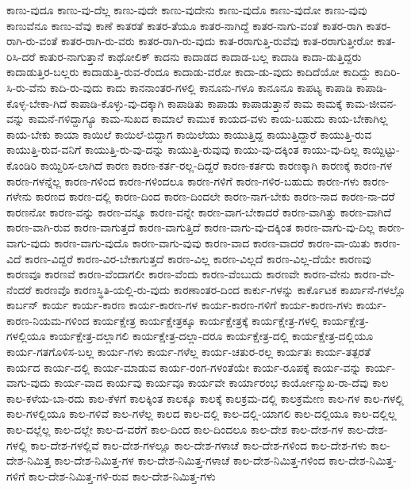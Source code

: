 {ಕಾಣು-ವುದೂ
ಕಾಣು-ವು-ದೆಲ್ಲ
ಕಾಣು-ವುದೇ
ಕಾಣು-ವುದೇನು
ಕಾಣು-ವುದೊ
ಕಾಣು-ವುದೋ
ಕಾಣು-ವುವು
ಕಾಣುವೆನೂ
ಕಾಣು-ವೆವು
ಕಾಣೆ
ಕಾತರತೆ
ಕಾತರ-ತೆಯೂ
ಕಾತರ-ನಾಗಿದ್ದೆ
ಕಾತರ-ನಾಗು-ವಂತೆ
ಕಾತರ-ರಾಗಿ
ಕಾತರ-ರಾಗಿ-ರು-ವಂತೆ
ಕಾತರ-ರಾಗಿ-ರು-ವರು
ಕಾತರ-ರಾಗಿ-ರು-ವುದು
ಕಾತ-ರರಾಗುತ್ತಿ-ರುವೆವು
ಕಾತ-ರರಾಗುತ್ತೀರೋ
ಕಾತ-ರಿಸಿ-ದರೆ
ಕಾತುರ-ನಾಗುತ್ತಾನೆ
ಕಾಥೋಲಿಕ್
ಕಾದನು
ಕಾದಾಡದ
ಕಾದಾಡ-ಬಲ್ಲ
ಕಾದಾಡಿ
ಕಾದಾ-ಡುತ್ತಿದ್ದರು
ಕಾದಾಡುತ್ತಿರ-ಬಲ್ಲರು
ಕಾದಾಡುತ್ತಿ-ರುವ-ರೆಂದೂ
ಕಾದಾಡು-ವರೋ
ಕಾದಾ-ಡು-ವುದು
ಕಾದಿದೆಯೋ
ಕಾದಿದ್ದು
ಕಾದಿರಿ-ಸಿ-ರು-ವೆನು
ಕಾದಿ-ರು-ವುದು
ಕಾದು
ಕಾನನಾಂತರ-ಗಳಲ್ಲಿ
ಕಾನೂನು-ಗಳೂ
ಕಾನೂನೂ
ಕಾಪಟ್ಯ
ಕಾಪಾಡಿ
ಕಾಪಾಡಿ-ಕೊಳ್ಳ-ಬೇಕಾ-ಗಿದೆ
ಕಾಪಾಡಿ-ಕೊಳ್ಳು-ವು-ದಕ್ಕಾಗಿ
ಕಾಪಾಡಿತು
ಕಾಪಾಡು
ಕಾಪಾಡುತ್ತಾನೆ
ಕಾಮ
ಕಾಮಕ್ಕೆ
ಕಾಮ-ಜೀವನ-ವನ್ನು
ಕಾಮನೆ-ಗಳಿದ್ದಾಗ್ಯೂ
ಕಾಮ-ಸುಖದ
ಕಾಮಾಲೆ
ಕಾಮುಕ
ಕಾಯದ-ವಳು
ಕಾಯ-ಬಹುದು
ಕಾಯ-ಬೇಕಾಗಿಲ್ಲ
ಕಾಯ-ಬೇಕು
ಕಾಯಾ
ಕಾಯಿಲೆ
ಕಾಯಿಲೆ-ಬಿದ್ದಾಗ
ಕಾಯಿಲೆಯು
ಕಾಯುತ್ತಿದ್ದ
ಕಾಯುತ್ತಿದ್ದಾರೆ
ಕಾಯುತ್ತಿ-ರುವ
ಕಾಯುತ್ತಿ-ರುವ-ವನಿಗೆ
ಕಾಯುತ್ತಿ-ರು-ವು-ದನ್ನು
ಕಾಯುತ್ತಿ-ರುವುವು
ಕಾಯು-ವು-ದಕ್ಕಿಂತ
ಕಾಯು-ವು-ದಿಲ್ಲ
ಕಾಯ್ದಿಟ್ಟು-ಕೊಂಡಿರಿ
ಕಾಯ್ದಿರಿಸ-ಲಾಗಿದೆ
ಕಾರಣ
ಕಾರಣ-ಕರ್ತ-ರಲ್ಲ-ದಿದ್ದರೆ
ಕಾರಣ-ಕರ್ತರು
ಕಾರಣಕ್ಕಾಗಿ
ಕಾರಣಕ್ಕೆ
ಕಾರಣ-ಗಳ
ಕಾರಣ-ಗಳನ್ನೆಲ್ಲ
ಕಾರಣ-ಗಳಿಂದ
ಕಾರಣ-ಗಳಿಂದಲೂ
ಕಾರಣ-ಗಳಿಗೆ
ಕಾರಣ-ಗಳಿರ-ಬಹುದು
ಕಾರಣ-ಗಳು
ಕಾರಣ-ಗಳೇನು
ಕಾರಣದ
ಕಾರಣ-ದಲ್ಲಿ
ಕಾರಣ-ದಿಂದ
ಕಾರಣ-ದಿಂದಲೇ
ಕಾರಣ-ನಾಗ-ಬೇಕು
ಕಾರಣ-ನಾದ
ಕಾರಣ-ನಾ-ದರೆ
ಕಾರಣನೋ
ಕಾರಣ-ವನ್ನು
ಕಾರಣ-ವನ್ನೂ
ಕಾರಣ-ವನ್ನೇ
ಕಾರಣ-ವಾಗ-ಬೇಕಾದರೆ
ಕಾರಣ-ವಾಗಿತ್ತು
ಕಾರಣ-ವಾಗಿದೆ
ಕಾರಣ-ವಾಗಿ-ರುವ
ಕಾರಣ-ವಾಗುತ್ತದೆ
ಕಾರಣ-ವಾಗುತ್ತಿದೆ
ಕಾರಣ-ವಾಗು-ವು-ದಕ್ಕಿಂತ
ಕಾರಣ-ವಾಗು-ವು-ದಿಲ್ಲ
ಕಾರಣ-ವಾಗು-ವುದು
ಕಾರಣ-ವಾಗು-ವುದೊ
ಕಾರಣ-ವಾಗು-ವುವು
ಕಾರಣ-ವಾದ
ಕಾರಣ-ವಾದರೆ
ಕಾರಣ-ವಾ-ಯಿತು
ಕಾರಣ-ವಿದೆ
ಕಾರಣ-ವಿದ್ದರೆ
ಕಾರಣ-ವಿರ-ಬೇಕಾಗುತ್ತದೆ
ಕಾರಣ-ವಿಲ್ಲ
ಕಾರಣ-ವಿಲ್ಲದೆ
ಕಾರಣ-ವಿಲ್ಲ-ದೆಯೇ
ಕಾರಣವು
ಕಾರಣವೂ
ಕಾರಣವೆ
ಕಾರಣ-ವೆಂದಾಗಲೀ
ಕಾರಣ-ವೆಂದು
ಕಾರಣ-ವೆಂಬುದು
ಕಾರಣವೇ
ಕಾರಣ-ವೇನು
ಕಾರಣ-ವೇ-ನೆಂದರೆ
ಕಾರಣವೊ
ಕಾರಣಸ್ಥಿತಿ-ಯಲ್ಲಿ-ರು-ವುದು
ಕಾರಣಾಂತರ-ದಿಂದ
ಕಾರ್ಕು-ಗಳನ್ನು
ಕಾರ್ಕೊಟಕ
ಕಾರ್ಖಾನೆ-ಗಳಲ್ಲೊ
ಕಾರ್ಬನ್
ಕಾರ್ಯ
ಕಾರ್ಯ-ಕಾರಣ
ಕಾರ್ಯ-ಕಾರಣ-ಗಳ
ಕಾರ್ಯ-ಕಾರಣ-ಗಳಿಗೆ
ಕಾರ್ಯ-ಕಾರಣ-ಗಳು
ಕಾರ್ಯ-ಕಾರಣ-ನಿಯಮ-ಗಳಿಂದ
ಕಾರ್ಯಕ್ಷೇತ್ರ
ಕಾರ್ಯಕ್ಷೇತ್ರಕ್ಕೂ
ಕಾರ್ಯಕ್ಷೇತ್ರಕ್ಕೆ
ಕಾರ್ಯಕ್ಷೇತ್ರ-ಗಳಲ್ಲಿ
ಕಾರ್ಯಕ್ಷೇತ್ರ-ಗಳಲ್ಲಿಯೂ
ಕಾರ್ಯಕ್ಷೇತ್ರ-ದಲ್ಲಾಗಲಿ
ಕಾರ್ಯಕ್ಷೇತ್ರ-ದಲ್ಲಾ-ದರೂ
ಕಾರ್ಯಕ್ಷೇತ್ರ-ದಲ್ಲಿ
ಕಾರ್ಯಕ್ಷೇತ್ರ-ದಲ್ಲಿಯೂ
ಕಾರ್ಯ-ಗತಗೊಳಿಸ-ಬಲ್ಲ
ಕಾರ್ಯ-ಗಳು
ಕಾರ್ಯ-ಗಳೆಲ್ಲ
ಕಾರ್ಯ-ಚತುರ-ರಲ್ಲ
ಕಾರ್ಯತಃ
ಕಾರ್ಯ-ತತ್ಪರತೆ
ಕಾರ್ಯದ
ಕಾರ್ಯ-ದಲ್ಲಿ
ಕಾರ್ಯ-ಮಾಡುವ
ಕಾರ್ಯ-ರಂಗ-ಗಳಂತೆಯೇ
ಕಾರ್ಯ-ರೂಪಕ್ಕೆ
ಕಾರ್ಯ-ವನ್ನು
ಕಾರ್ಯ-ವಾಗು-ವುದು
ಕಾರ್ಯ-ವಾದ
ಕಾರ್ಯವು
ಕಾರ್ಯವೂ
ಕಾರ್ಯವೇ
ಕಾರ್ಯಾರಂಭ
ಕಾರ್ಯೋನ್ಮುಖ-ರಾ-ದೆವು
ಕಾಲ
ಕಾಲ-ಕಳೆಯ-ಬಾ-ರದು
ಕಾಲ-ಕೆಳಗೆ
ಕಾಲಕ್ಕಿಂತ
ಕಾಲಕ್ಕೂ
ಕಾಲಕ್ಕೆ
ಕಾಲಕ್ರಮ-ದಲ್ಲಿ
ಕಾಲಕ್ರಮೇಣ
ಕಾಲ-ಗಳ
ಕಾಲ-ಗಳಲ್ಲಿ
ಕಾಲ-ಗಳಲ್ಲಿಯೂ
ಕಾಲ-ಗಳಿವೆ
ಕಾಲ-ಗಳೆಲ್ಲ
ಕಾಲದ
ಕಾಲ-ದಲ್ಲಿ
ಕಾಲ-ದಲ್ಲಿ-ಯಾಗಲಿ
ಕಾಲ-ದಲ್ಲಿಯೂ
ಕಾಲ-ದಲ್ಲಿಲ್ಲ
ಕಾಲ-ದಲ್ಲೆಲ್ಲ
ಕಾಲ-ದಲ್ಲೇ
ಕಾಲ-ದ-ವರೆಗೆ
ಕಾಲ-ದಿಂದ
ಕಾಲ-ದಿಂದಲೂ
ಕಾಲ-ದೇಶ
ಕಾಲ-ದೇಶ-ಗಳ
ಕಾಲ-ದೇಶ-ಗಳಲ್ಲಿ
ಕಾಲ-ದೇಶ-ಗಳಲ್ಲಿವೆ
ಕಾಲ-ದೇಶ-ಗಳಲ್ಲೂ
ಕಾಲ-ದೇಶ-ಗಳಾಚೆ
ಕಾಲ-ದೇಶ-ಗಳಿಂದ
ಕಾಲ-ದೇಶ-ಗಳು
ಕಾಲ-ದೇಶ-ನಿಮಿತ್ತ
ಕಾಲ-ದೇಶ-ನಿಮಿತ್ತ-ಗಳ
ಕಾಲ-ದೇಶ-ನಿಮಿತ್ತ-ಗಳಾಚೆ
ಕಾಲ-ದೇಶ-ನಿಮಿತ್ತ-ಗಳಿಂದ
ಕಾಲ-ದೇಶ-ನಿಮಿತ್ತ-ಗಳಿಗೆ
ಕಾಲ-ದೇಶ-ನಿಮಿತ್ತ-ಗಳಿ-ರುವ
ಕಾಲ-ದೇಶ-ನಿಮಿತ್ತ-ಗಳು
}
